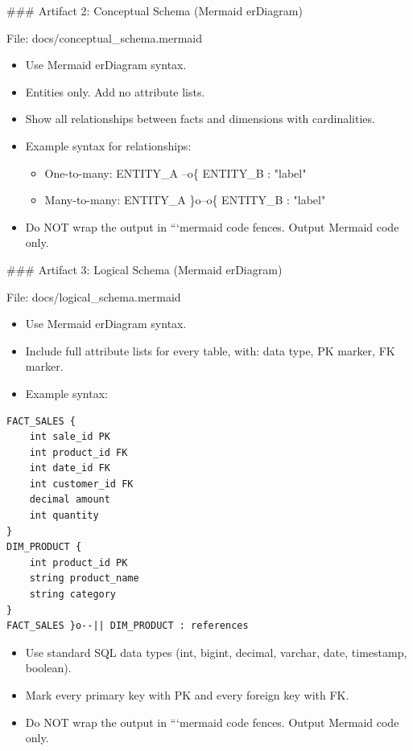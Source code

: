 \#\#\# Artifact 2: Conceptual Schema (Mermaid erDiagram)
\newline

File: docs/conceptual\_schema.mermaid
\newline

\begin{itemize}
    \item Use Mermaid erDiagram syntax.
    \item Entities only. Add no attribute lists.
    \item Show all relationships between facts and dimensions with cardinalities.
    \item Example syntax for relationships:
    \begin{itemize}
        \item One-to-many: ENTITY\_A \textbar\textbar--o\{ ENTITY\_B : "label"
        \item Many-to-many: ENTITY\_A \}o--o\{ ENTITY\_B : "label"
    \end{itemize}
    \item Do NOT wrap the output in ```mermaid code fences. Output Mermaid code only.
\end{itemize}

\#\#\# Artifact 3: Logical Schema (Mermaid erDiagram)
\newline

File: docs/logical\_schema.mermaid
\newline

\begin{itemize}
    \item Use Mermaid erDiagram syntax.
    \item Include full attribute lists for every table, with: data type, PK marker, FK marker.
    \item Example syntax:
\end{itemize}
\begin{verbatim}
FACT_SALES {
    int sale_id PK
    int product_id FK
    int date_id FK
    int customer_id FK
    decimal amount
    int quantity
}
DIM_PRODUCT {
    int product_id PK
    string product_name
    string category
}
FACT_SALES }o--|| DIM_PRODUCT : references
\end{verbatim}
\begin{itemize}
    \item Use standard SQL data types (int, bigint, decimal, varchar, date, timestamp, boolean).
    \item Mark every primary key with PK and every foreign key with FK.
    \item Do NOT wrap the output in ```mermaid code fences. Output Mermaid code only.
\end{itemize}

